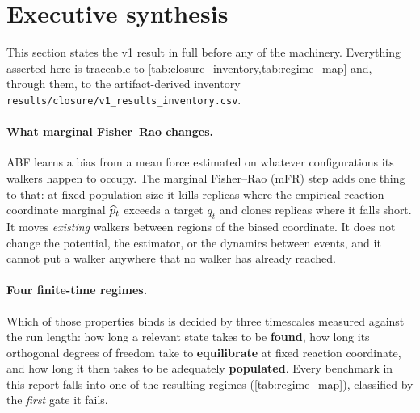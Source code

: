 \section{Executive synthesis}
\label{sec:executive}

This section states the v1 result in full before any of the machinery. Everything asserted
here is traceable to \cref{tab:closure_inventory,tab:regime_map} and, through them, to the
artifact-derived inventory\\
\texttt{results/closure/v1\_results\_inventory.csv}.

\paragraph{What marginal Fisher--Rao changes.}
ABF learns a bias from a mean force estimated on whatever configurations its walkers happen
to occupy. The marginal Fisher--Rao (mFR) step adds one thing to that: at fixed population
size it kills replicas where the empirical reaction-coordinate marginal $\widehat{p}_t$ exceeds a
target $q_t$ and clones replicas where it falls short. It moves \emph{existing} walkers
between regions of the biased coordinate. It does not change the potential, the estimator, or
the dynamics between events, and it cannot put a walker anywhere that no walker has already
reached.

\paragraph{Four finite-time regimes.}
Which of those properties binds is decided by three timescales measured against the run length:
how long a relevant state takes to be \textbf{found}, how long its orthogonal degrees of
freedom take to \textbf{equilibrate} at fixed reaction coordinate, and how long it then takes
to be adequately \textbf{populated}. Every benchmark in this report falls into one of the
resulting regimes (\cref{tab:regime_map}), classified by the \emph{first} gate it fails.

